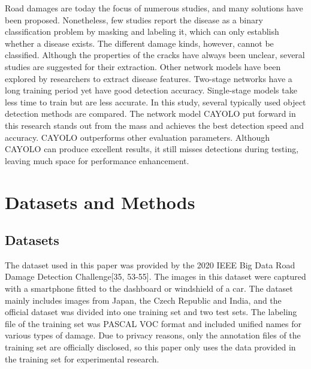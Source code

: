\documentclass[sensors,article,submit,moreauthors]{Definitions/mdpi}
\begin{document}

    Road damages are today the focus of numerous studies, and many solutions have been proposed. Nonetheless, few studies report the disease as a binary classification problem by masking and labeling it, which can only establish whether a disease exists. The different damage kinds, however, cannot be classified. Although the properties of the cracks have always been unclear, several studies are suggested for their extraction. Other network models have been explored by researchers to extract disease features. Two-stage networks have a long training period yet have good detection accuracy. Single-stage models take less time to train but are less accurate. In this study, several typically used object detection methods are compared. The network model CAYOLO put forward in this research stands out from the mass and achieves the best detection speed and accuracy. CAYOLO outperforms other evaluation parameters. Although CAYOLO can produce excellent results, it still misses detections during testing, leaving much space for performance enhancement.




    \section{Datasets and Methods}

    \subsection{Datasets}

    The dataset used in this paper was provided by the 2020 IEEE Big Data Road Damage Detection Challenge[35, 53-55]\citep{maeda2021generative,arya2021deep,arya2021rdd2020,arya2020global}. The images in this dataset were captured with a smartphone fitted to the dashboard or windshield of a car. The dataset mainly includes images from Japan, the Czech Republic and India, and the official dataset was divided into one training set and two test sets. The labeling file of the training set was PASCAL VOC format and included unified names for various types of damage. Due to privacy reasons, only the annotation files of the training set are officially disclosed, so this paper only uses the data provided in the training set for experimental research.
\end{document}
